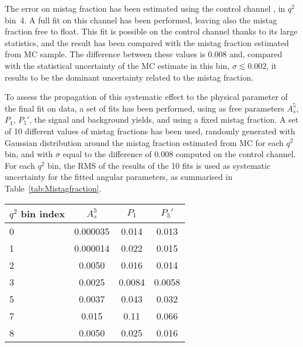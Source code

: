 The error on mistag fraction has been estimated using the control channel \BtoKstJpsi, in $q^2$ bin~4.
A full fit on this channel has been performed, leaving also the mistag fraction free to float.
This fit is possible on the control channel thanks to its large statistics, and the result has been compared with the mistag fraction estimated from MC sample.
The difference between these values is 0.008 and, compared with the statistical uncertainty of the MC estimate in this bin, $\sigma\lesssim0.002$, it results to be the dominant uncertainty related to the mistag fraction.

To assess the propagation of this systematic effect to the physical parameter of the final fit on data, a set of fits has been performed, using as free parameters $A_s^5$, $P_1$, $P_5'$, the signal and background yields, and using a fixed mistag fraction.
A set of 10 different values of mistag fractions has been used, randomly generated with Gaussian distribution around the mistag fraction estimated from MC for each $q^2$ bin, and with $\sigma$ equal to the difference of 0.008 computed on the control channel.
For each $q^2$ bin, the RMS of the results of the 10 fits is used as systematic uncertainty for the fitted angular parameters, as summarised in Table~\ref{tab:Mistagfraction}.

\begin{table*}[!htb]
  \begin {center}
    \caption{Systematic uncertainties: mistag fraction.\label{tab:Mistagfraction}}
    \begin{tabular}{l|c|c|c}
      $q^2$ bin index & $A_s^5$  & $P_1$ & $P_5'$  \\
      \hline
      \hline
      0  & 0.000035 & 0.014  &  0.013 \\
      1  & 0.000014 & 0.022  &  0.015 \\
      2  & 0.0050   & 0.016  &  0.014 \\ 
      3  & 0.0025   & 0.0084 &  0.0058\\ 
      5  & 0.0037   & 0.043  &  0.032  \\ 
      7  & 0.015    & 0.11   &  0.066 \\
      8  & 0.0050   & 0.025  &  0.016 \\
    \end{tabular}

  \end{center}
\end{table*}


